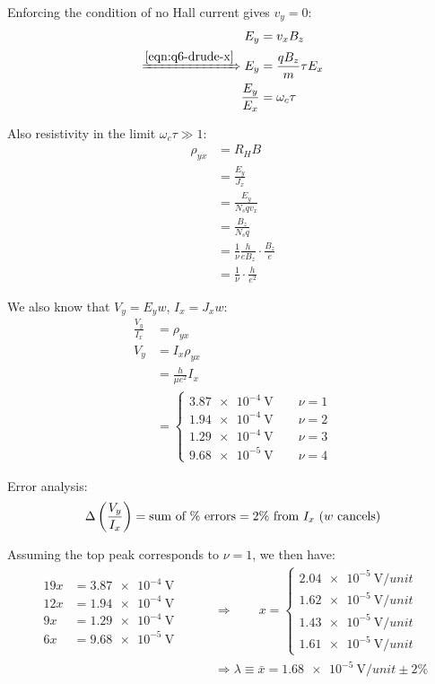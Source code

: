 \begin{parts}
	Enforcing the condition of no Hall current gives $v_y = 0$:
	\begin{align*}
		E_y &= v_x B_z \\
		\xRightarrow{\eqref{eqn:q6-drude-x}} E_y &= \frac{qB_z}{m}\tau E_x \\
		\frac{E_y}{E_x} &= \omega_c \tau
	\end{align*}
	
	Also resistivity in the limit $\omega_c \tau \gg 1$:
	\begin{align*}
		\rho_{yx} &= R_H B \\
		&= \frac{E_y}{J_x} \\
		&= \frac{E_y}{N_s q v_x} \\
		&= \frac{B_z}{N_s q} \\
		&= \frac{1}{\nu} \frac{h}{eB_z} \cdot \frac{B_z}{e} \\
		&= \frac{1}{\nu} \cdot \frac{h}{e^2}
	\end{align*}
	
	We also know that $V_y = E_y w$, $I_x = J_x w$:
	\begin{align*}
		\frac{V_y}{I_x} &= \rho_{yx} \\
		V_y &= I_x \rho_{yx} \\
		&= \frac{h}{\mu e^2}I_x \\
		&= \begin{cases}
			\SI{3.87e-4}{\volt} \qquad \nu = 1 \\
			\SI{1.94e-4}{\volt} \qquad \nu = 2 \\
			\SI{1.29e-4}{\volt} \qquad \nu = 3 \\
			\SI{9.68e-5}{\volt} \qquad \nu = 4
		\end{cases}
	\end{align*}
	
	Error analysis:
	\begin{equation*}
		\Delta\left(\frac{V_y}{I_x}\right) = \textnormal{sum of \% errors} = \textnormal{2\% from $I_x$ ($w$ cancels)}
	\end{equation*}
	
	Assuming the top peak corresponds to $\nu = 1$, we then have:
	\begin{align*}
		\begin{aligned}
			19x &= \SI{3.87e-4}{\volt} \\
			12x &= \SI{1.94e-4}{\volt} \\
			9x &= \SI{1.29e-4}{\volt} \\
			6x &= \SI{9.68e-5}{\volt}
		\end{aligned}
		\qquad & \Rightarrow \qquad
		x = \begin{cases}
			\SI{2.04e-5}{\volt/unit} \\
			\SI{1.62e-5}{\volt/unit} \\
			\SI{1.43e-5}{\volt/unit} \\
			\SI{1.61e-5}{\volt/unit}
		\end{cases} \\
		&\Rightarrow \lambda \equiv \bar{x} = \SI{1.68e-5}{\volt/unit} \pm 2\%
	\end{align*}
	

\end{parts}
